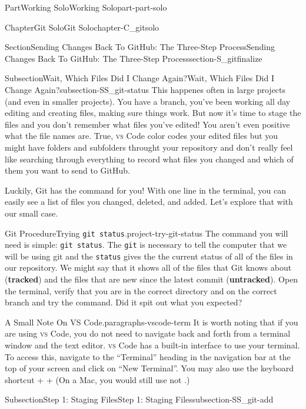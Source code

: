\documentclass[oneside,10pt,]{book}
\newcommand{\mono}[1]{\texttt{#1}}
\newcommand{\initialism}[1]{\textsc{\MakeLowercase{#1}}}
\DeclareRobustCommand{\initialismintitle}[1]{\texorpdfstring{#1}{#1}}
\newcommand{\terminology}[1]{\textbf{#1}}
\newcommand{\kbd}[1]{\keys{{#1}}}
\begin{document}
\begin{partptx}{Part}{Working Solo}{}{Working Solo}{}{}{part-part-solo}
\begin{chapterptx}{Chapter}{Git Solo}{}{Git Solo}{}{}{chapter-C_gitsolo}
\begin{sectionptx}{Section}{Sending Changes Back To GitHub: The Three-Step Process}{}{Sending Changes Back To GitHub: The Three-Step Process}{}{}{section-S_gitfinalize}
\begin{subsectionptx}{Subsection}{Wait, Which Files Did I Change Again?}{}{Wait, Which Files Did I Change Again?}{}{}{subsection-SS_git-status}
%
This happenes often in large projects (and even in smaller projects). You have a branch, you've been working all day editing and creating files, making sure things work. But now it's time to stage the files and you don't remember what files you've edited! You aren't even positive what the file names are. True, \initialism{VS} Code color codes your edited files but you might have folders and subfolders throught your repository and don't really feel like searching through everything to record what files you changed and which of them you want to send to GitHub.%
\par
Luckily, Git has the command for you! With one line in the terminal, you can easily see a list of files you changed, deleted, and added. Let's explore that with our small case.%
\begin{project}{Git Procedure}{Trying \mono{git status}.}{project-try-git-status}%
%
%
The command you will need is simple: \mono{git status}. The \mono{git} is necessary to tell the computer that we will be using git and the \mono{status} gives the the current status of all of the files in our repository. We might say that it shows all of the files that Git knows about (\terminology{tracked}) and the files that are new since the latest commit (\terminology{untracked}). Open the terminal, verify that you are in the correct directory and on the correct branch and try the command. Did it spit out what you expected?%
\end{project}%
\begin{paragraphs}{A Small Note On \initialismintitle{VS} Code.}{paragraphs-vscode-term}%
It is worth noting that if you are using \initialism{VS} Code, you do not need to navigate back and forth from a terminal window and the text editor. \initialism{VS} Code has a built-in interface to use your terminal. To access this, navigate to the ``Terminal'' heading in the navigation bar at the top of your screen and click on ``New Terminal''. You may also use the keyboard shortcut \kbd{Ctrl} + \kbd{Shift} + \kbd{\textasciigrave{}} (On a Mac, you would still use \kbd{Ctrl} not \kbd{command}.)%
\end{paragraphs}%
\end{subsectionptx}
%
%
\typeout{************************************************}
\typeout{************************************************}
%
\begin{subsectionptx}{Subsection}{Step 1: Staging Files}{}{Step 1: Staging Files}{}{}{subsection-SS_git-add}

\end{subsectionptx}
\end{sectionptx}
\end{chapterptx}
\end{partptx}
\end{document}
